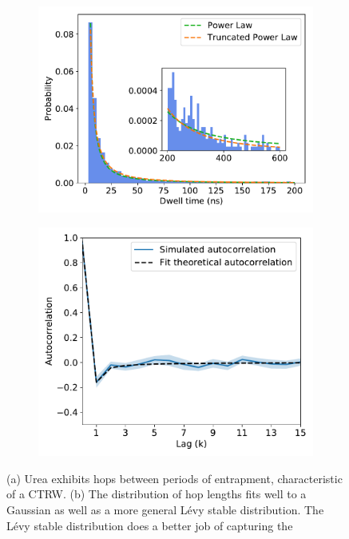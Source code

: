 \documentclass{article}
\begin{document}
\begin{figure}
  \begin{subfigure}{0.45\textwidth}
  \includegraphics[width=\textwidth]{URE_powerlaw.pdf}
  \caption{}\label{fig:powerlaw}
  \end{subfigure}
  \begin{subfigure}{0.45\textwidth}
  \includegraphics[width=\textwidth]{URE_hop_acf.pdf}
  \caption{}\label{fig:hop_acf}
  \end{subfigure}
  \caption{(a) Urea exhibits hops between periods of entrapment, characteristic of a CTRW. 
  (b) The distribution of hop lengths fits well to a Gaussian as well as a more general L\'evy 
  stable distribution. The L\'evy stable distribution does a better job of capturing the 
}
\end{figure}
\end{document}

